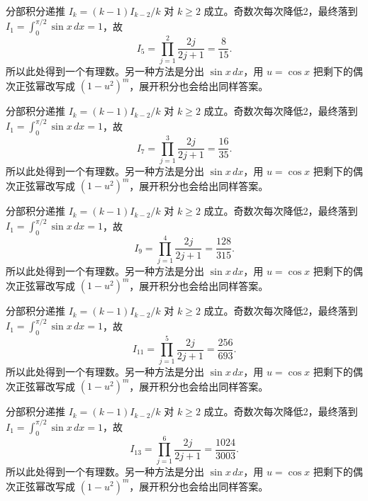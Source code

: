 \documentclass[UTF8,12pt,a4paper,fontset=fandol]{ctexart}
\begin{document}
\begin{solve}\label{ans:c16q8}
分部积分递推 $I_k=(k-1)I_{k-2}/k$ 对 $k\ge2$ 成立。奇数次每次降低2，最终落到 $I_1=\int_0^{\pi/2}\sin x\,dx=1$，故
\[
I_{5}=\prod_{j=1}^{2}\frac{2j}{2j+1}=\frac{8}{15}.
\]
所以此处得到一个有理数。另一种方法是分出 $\sin x\,dx$，用 $u=\cos x$ 把剩下的偶次正弦幂改写成 $(1-u^2)^m$，展开积分也会给出同样答案。
\end{solve}

\begin{solve}\label{ans:c16q9}
分部积分递推 $I_k=(k-1)I_{k-2}/k$ 对 $k\ge2$ 成立。奇数次每次降低2，最终落到 $I_1=\int_0^{\pi/2}\sin x\,dx=1$，故
\[
I_{7}=\prod_{j=1}^{3}\frac{2j}{2j+1}=\frac{16}{35}.
\]
所以此处得到一个有理数。另一种方法是分出 $\sin x\,dx$，用 $u=\cos x$ 把剩下的偶次正弦幂改写成 $(1-u^2)^m$，展开积分也会给出同样答案。
\end{solve}

\begin{solve}\label{ans:c16q10}
分部积分递推 $I_k=(k-1)I_{k-2}/k$ 对 $k\ge2$ 成立。奇数次每次降低2，最终落到 $I_1=\int_0^{\pi/2}\sin x\,dx=1$，故
\[
I_{9}=\prod_{j=1}^{4}\frac{2j}{2j+1}=\frac{128}{315}.
\]
所以此处得到一个有理数。另一种方法是分出 $\sin x\,dx$，用 $u=\cos x$ 把剩下的偶次正弦幂改写成 $(1-u^2)^m$，展开积分也会给出同样答案。
\end{solve}

\begin{solve}\label{ans:c16q11}
分部积分递推 $I_k=(k-1)I_{k-2}/k$ 对 $k\ge2$ 成立。奇数次每次降低2，最终落到 $I_1=\int_0^{\pi/2}\sin x\,dx=1$，故
\[
I_{11}=\prod_{j=1}^{5}\frac{2j}{2j+1}=\frac{256}{693}.
\]
所以此处得到一个有理数。另一种方法是分出 $\sin x\,dx$，用 $u=\cos x$ 把剩下的偶次正弦幂改写成 $(1-u^2)^m$，展开积分也会给出同样答案。
\end{solve}

\begin{solve}\label{ans:c16q12}
分部积分递推 $I_k=(k-1)I_{k-2}/k$ 对 $k\ge2$ 成立。奇数次每次降低2，最终落到 $I_1=\int_0^{\pi/2}\sin x\,dx=1$，故
\[
I_{13}=\prod_{j=1}^{6}\frac{2j}{2j+1}=\frac{1024}{3003}.
\]
所以此处得到一个有理数。另一种方法是分出 $\sin x\,dx$，用 $u=\cos x$ 把剩下的偶次正弦幂改写成 $(1-u^2)^m$，展开积分也会给出同样答案。
\end{solve}
\end{document}
